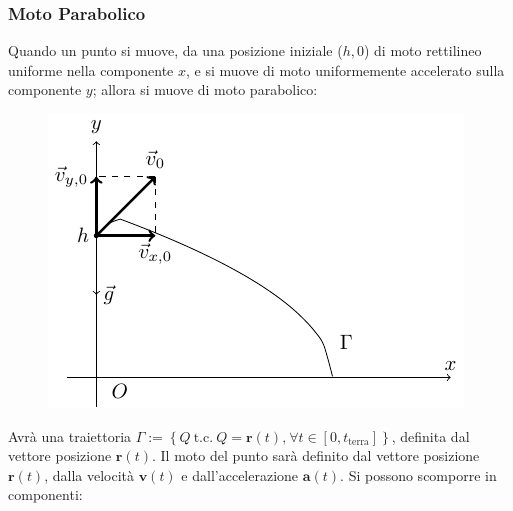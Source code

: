 \documentclass{article}
\newcommand{\vect}[1]{\boldsymbol{\mathbf{#1}}}
\numberwithin{equation}{subsection}
\begin{document}
\subsubsection{Moto Parabolico}
Quando un punto si muove, da una posizione iniziale 
($h, 0$) di moto rettilineo uniforme nella 
componente $x$, e si muove di moto uniformemente 
accelerato sulla componente $y$; allora si muove di 
moto parabolico:

\begin{figure}[H]%
    \centering
    \includegraphics{parabolico.pdf}%
\end{figure}


Avrà una traiettoria $\Gamma := \left\{Q\:\mbox{t.c.}\:Q=\vect{r}(t)\mbox{,}\:\forall t\in \left[0, t_\mathrm{terra}\right] \right\}$, 
definita dal vettore posizione $\vect{r}(t)$. Il moto del 
punto sarà definito dal vettore posizione $\vect{r}(t)$, dalla velocità 
$\vect{v}(t)$ e dall'accelerazione $\vect{a}(t)$.
Si possono scomporre in componenti:
\end{document}
